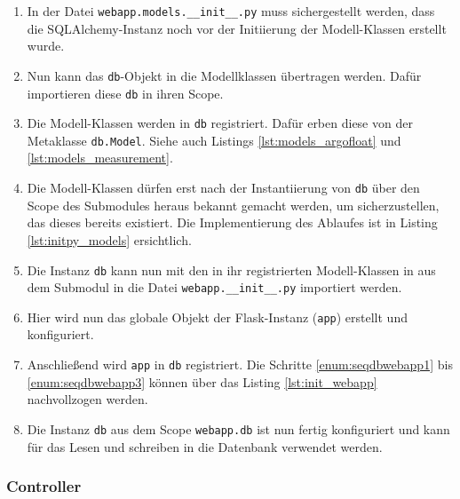 \begin{enumerate}
 \item 
        In der Datei \texttt{webapp.models.\_\_init\_\_.py} muss sichergestellt werden, dass die SQLAlchemy-Instanz noch vor der Initiierung der Modell-Klassen erstellt wurde.
 \item 
        Nun kann das \texttt{db}-Objekt in die Modellklassen übertragen werden. Dafür importieren diese \texttt{db} in ihren Scope.
 \item 
        Die Modell-Klassen werden in \texttt{db} registriert. Dafür erben diese von der Metaklasse \texttt{db.Model}. Siehe auch Listings \ref{lst:models_argofloat} und \ref{lst:models_measurement}.
        

    
 \item 
        Die Modell-Klassen dürfen erst nach der Instantiierung von \texttt{db} über den Scope des Submodules heraus bekannt gemacht werden, um sicherzustellen, das dieses bereits existiert. Die Implementierung des Ablaufes ist in Listing \ref{lst:initpy_models} ersichtlich.
 \item  \label{enum:seqdbwebapp1}
        Die Instanz \texttt{db} kann nun mit den in ihr registrierten Modell-Klassen in aus dem Submodul in die Datei \texttt{webapp.\_\_init\_\_.py} importiert werden.

\item   
        Hier wird nun das globale Objekt der Flask-Instanz (\texttt{app}) erstellt und konfiguriert. 
        
        
\item   \label {enum:seqdbwebapp3}
        Anschließend wird \texttt{app} in \texttt{db} registriert. Die Schritte \ref{enum:seqdbwebapp1} bis \ref{enum:seqdbwebapp3} können über das Listing \ref{lst:init_webapp} nachvollzogen werden.
        
\item   Die Instanz \texttt{db} aus dem Scope        
        \texttt{webapp.db} ist nun fertig konfiguriert und kann für das Lesen und schreiben in die Datenbank verwendet werden.
\end{enumerate}


\pagebreak
\subsubsection{Controller}

